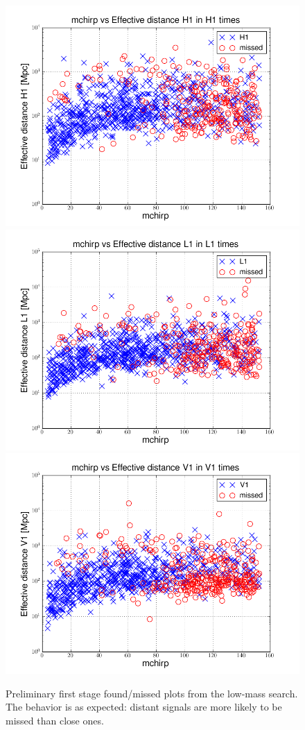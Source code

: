 \begin{figure}
  \includegraphics[width=0.5\linewidth]{figures/ninja2_results/H1-plotinspmissed_LOW_FULL_DATA_mchirp-eff_dist-log-H1-871147552-5209912_first} 
  \includegraphics[width=0.5\linewidth]{figures/ninja2_results/L1-plotinspmissed_LOW_FULL_DATA_mchirp-eff_dist-log-L1-871147552-5209912_first} \\
  \includegraphics[width=0.5\linewidth]{figures/ninja2_results/V1-plotinspmissed_LOW_FULL_DATA_mchirp-eff_dist-log-V1-871147552-5209912_first} \\
  \caption[First stage found/missed plots from the low-mass search]{
  \label{f:ninja2_cbc_results_high_first}
Preliminary first stage found/missed plots from the low-mass search.
The behavior is as expected: distant signals are more likely to be
missed than close ones.
}
\end{figure}%

